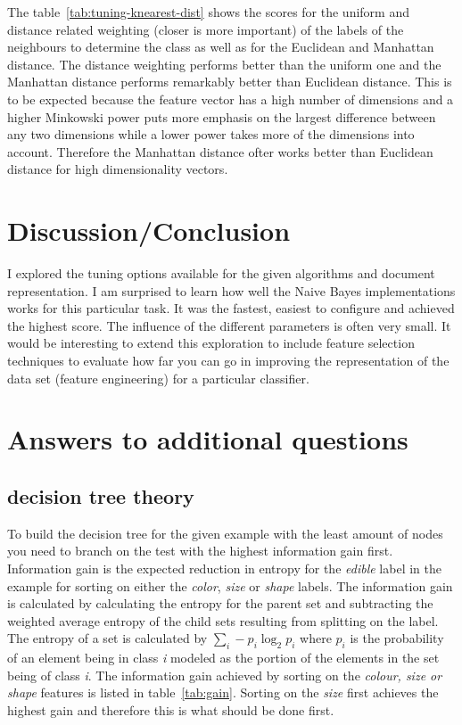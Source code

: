 \documentclass[11pt]{article}
\begin{document}
The table~\ref{tab:tuning-knearest-dist} shows the scores for the uniform and distance related weighting (closer is more important) of the labels of the neighbours to determine the class as well as for the Euclidean and Manhattan distance. The distance weighting performs better than the uniform one and the Manhattan distance performs remarkably better than Euclidean distance. This is to be expected because the feature vector has a high number of dimensions and a higher Minkowski power puts more emphasis on the largest difference between any two dimensions while a lower power takes more of the dimensions into account. Therefore the Manhattan distance ofter works better than Euclidean distance for high dimensionality vectors.

\section{Discussion/Conclusion}

I explored the tuning options available for the given algorithms and document representation. I am surprised to learn how well the Naive Bayes implementations works for this particular task. It was the fastest, easiest to configure and achieved the highest score. The influence of the different parameters is often very small. It would be interesting to extend this exploration to include feature selection techniques to evaluate how far you can go in improving the representation of the data set (feature engineering) for a particular classifier.

\section{Answers to additional questions}

\subsection{decision tree theory}

To build the decision tree for the given example with the least amount of nodes you need to branch on the test with the highest information gain first. Information gain is the expected reduction in entropy for the \emph{edible} label in the example for sorting on either the \emph{color}, \emph{size} or \emph{shape} labels. The information gain is calculated by calculating the entropy for the parent set and subtracting the weighted average entropy of the child sets resulting from splitting on the label. The entropy of a set is calculated by $\sum\limits_i - p_i \log_2 p_i $ where $p_i$ is the probability of an element being in class \emph{i} modeled as the portion of the elements in the set being of class \emph{i}. The information gain achieved by sorting on the \emph{colour, size or shape} features is listed in table~\ref{tab:gain}. Sorting on the \emph{size} first achieves the highest gain and therefore this is what should be done first.
\end{document}
